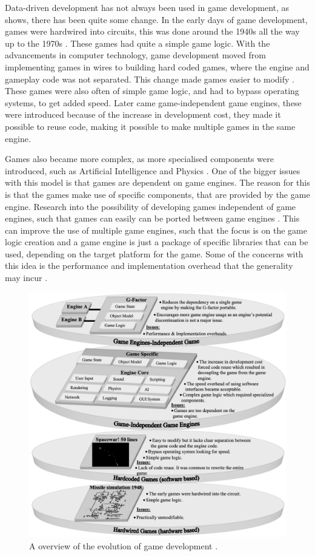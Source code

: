 Data-driven development has not always been used in game development, as  shows, there has been quite some change. In the early days of game development, games were hardwired into circuits, this was done around the 1940s all the way up to the 1970s \cite{cathod-hardwire}. These games had quite a simple game logic. With the advancements in computer technology, game development moved from implementing games in wires to building hard coded games, where the engine and gameplay code was not separated. This change made games easier to modify \cite{graetz1981origin}. These games were also often of simple game logic, and had to bypass operating systems, to get added speed. Later came game-independent game engines, these were introduced because of the increase in development cost, they made it possible to reuse code, making it possible to make multiple games in the same engine.

Games also became more complex, as more specialised components were introduced, such as Artificial Intelligence and Physics \cite{sherrod2006ultimate}.  One of the bigger issues with this model is that games are dependent on game engines. The reason for this is that the games make use of specific components, that are provided by the game engine. Research into the possibility of developing games independent of game engines, such that games can easily can be ported between game engines \cite{BinSubaih2007ASO}. This can improve the use of multiple game engines, such that the focus is on the game logic creation and a game engine is just a package of specific libraries that can be used, depending on the target platform for the game. Some of the concerns with this idea is the performance and implementation overhead that the generality may incur \cite{BinSubaih2007ASO}. 

\begin{figure}[H]
    \centering
    \includegraphics[width=.8\textwidth]{images/Game-development/Game-dev-history.png} 
    \caption{A overview of the evolution of game development \cite{BinSubaih2007ASO}.}
    \label{fig:game-dev-history}
\end{figure}






